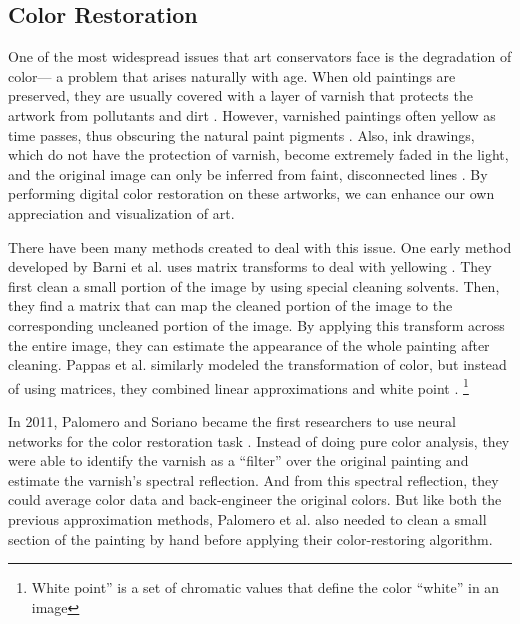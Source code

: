 \documentclass[a4paper,11pt]{article}
\begin{document}
\subsection{Color Restoration}

One of the most widespread issues that art conservators face is the degradation of color— a problem that arises naturally with age. When old paintings are preserved, they are usually covered with a layer of varnish that protects the artwork from pollutants and dirt \cite{amiri}. However, varnished paintings often yellow as time passes, thus obscuring the natural paint pigments \cite{amiri}\cite{barni2005}. Also, ink drawings, which do not have the protection of varnish, become extremely faded in the light, and the original image can only be inferred from faint, disconnected lines \cite{zeng2018}. By performing digital color restoration on these artworks, we can enhance our own appreciation and visualization of art. 

There have been many methods created to deal with this issue. One early method developed by Barni et al. uses matrix transforms to deal with yellowing \cite{barni2000}. They first clean a small portion of the image by using special cleaning solvents. Then, they find a matrix that can map the cleaned portion of the image to the corresponding uncleaned portion of the image. By applying this transform across the entire image, they can estimate the appearance of the whole painting after cleaning. Pappas et al. similarly modeled the transformation of color, but instead of using matrices, they combined linear approximations and white point \cite{papas}. \footnote{White point” is a set of chromatic values that define the color “white” in an image}

In 2011, Palomero and Soriano became the first researchers to use neural networks for the color restoration task \cite{palomero}. Instead of doing pure color analysis, they were able to identify the varnish as a “filter” over the original painting and estimate the varnish’s spectral reflection. And from this spectral reflection, they could average color data and back-engineer the original colors. But like both the previous approximation methods, Palomero et al. also needed to clean a small section of the painting by hand before applying their color-restoring algorithm. 
\end{document}
